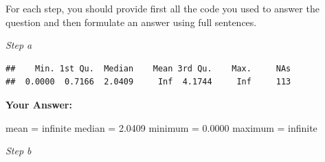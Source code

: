 \documentclass[
]{article}
\newenvironment{Shaded}{\begin{snugshade}}{\end{snugshade}}
\newcommand{\FunctionTok}[1]{\textcolor[rgb]{0.13,0.29,0.53}{\textbf{#1}}}
\newcommand{\NormalTok}[1]{#1}
\newcommand{\OtherTok}[1]{\textcolor[rgb]{0.56,0.35,0.01}{#1}}
\newcommand{\SpecialCharTok}[1]{\textcolor[rgb]{0.81,0.36,0.00}{\textbf{#1}}}
\begin{document}
For each step, you should provide first all the code you used to answer
the question and then formulate an answer using full sentences.

\emph{Step a}

\begin{Shaded}
\end{Shaded}

\begin{verbatim}
##    Min. 1st Qu.  Median    Mean 3rd Qu.    Max.     NAs 
##  0.0000  0.7166  2.0409     Inf  4.1744     Inf     113
\end{verbatim}

\textbf{Your Answer:}

mean = infinite median = 2.0409 minimum = 0.0000 maximum = infinite

\emph{Step b}

\begin{Shaded}
\end{Shaded}
\end{document}
